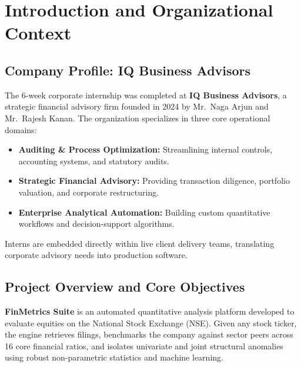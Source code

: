 
\section{Introduction and Organizational Context}

\subsection{Company Profile: IQ Business Advisors}
The 6-week corporate internship was completed at \textbf{IQ Business Advisors}, a strategic financial advisory firm founded in 2024 by Mr.~Naga Arjun and Mr.~Rajesh Kanan. The organization specializes in three core operational domains:
\begin{itemize}
    \item \textbf{Auditing \& Process Optimization:} Streamlining internal controls, accounting systems, and statutory audits.
    \item \textbf{Strategic Financial Advisory:} Providing transaction diligence, portfolio valuation, and corporate restructuring.
    \item \textbf{Enterprise Analytical Automation:} Building custom quantitative workflows and decision-support algorithms.
\end{itemize}
Interns are embedded directly within live client delivery teams, translating corporate advisory needs into production software.

\subsection{Project Overview and Core Objectives}
\textbf{FinMetrics Suite} is an automated quantitative analysis platform developed to evaluate equities on the National Stock Exchange (NSE). Given any stock ticker, the engine retrieves filings, benchmarks the company against sector peers across 16 core financial ratios, and isolates univariate and joint structural anomalies using robust non-parametric statistics and machine learning.

